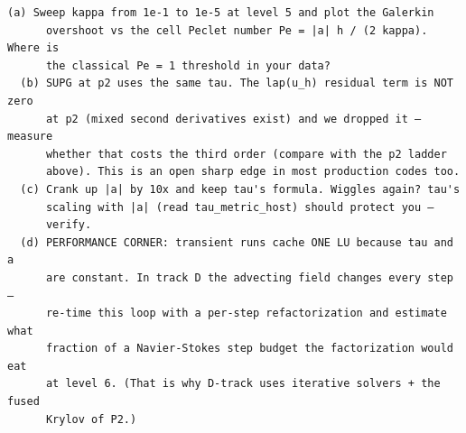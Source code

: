 \begin{explore}
\begin{verbatim}
(a) Sweep kappa from 1e-1 to 1e-5 at level 5 and plot the Galerkin
      overshoot vs the cell Peclet number Pe = |a| h / (2 kappa). Where is
      the classical Pe = 1 threshold in your data?
  (b) SUPG at p2 uses the same tau. The lap(u_h) residual term is NOT zero
      at p2 (mixed second derivatives exist) and we dropped it — measure
      whether that costs the third order (compare with the p2 ladder
      above). This is an open sharp edge in most production codes too.
  (c) Crank up |a| by 10x and keep tau's formula. Wiggles again? tau's
      scaling with |a| (read tau_metric_host) should protect you —
      verify.
  (d) PERFORMANCE CORNER: transient runs cache ONE LU because tau and a
      are constant. In track D the advecting field changes every step —
      re-time this loop with a per-step refactorization and estimate what
      fraction of a Navier-Stokes step budget the factorization would eat
      at level 6. (That is why D-track uses iterative solvers + the fused
      Krylov of P2.)
\end{verbatim}
\end{explore}
